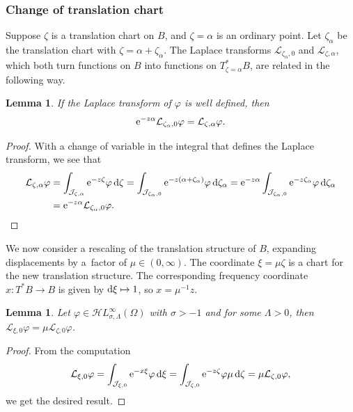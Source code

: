 \documentclass[pdftex]{sigma}
\newcommand{\singexp}[2]{\mathcal{H}L^\infty_{#1, #2}}
\newcommand{\maps}{\colon}
\newcommand{\laplace}{\mathcal{L}}
\numberwithin{equation}{section}
\newtheorem{Lemma}[Theorem]{Lemma}
\begin{document}
\subsubsection{Change of translation chart}\label{sec:change-translation}
Suppose $\zeta$ is a translation chart on $B$, and $\zeta = \alpha$ is an ordinary point. Let $\zeta_\alpha$ be the translation chart with $\zeta = \alpha + \zeta_\alpha$. The Laplace transforms $\laplace_{\zeta_\alpha, 0}$ and $\laplace_{\zeta, \alpha}$, which both turn functions on $B$ into functions on $T^*_{\zeta = \alpha}B$, are related in the following way.
\begin{Lemma}\label{translation}
If the Laplace transform of $\varphi$ is well defined, then
 \begin{equation}
 \label{change-chart}
 {\rm e}^{-z\alpha} \laplace_{\zeta_\alpha, 0} \varphi = \laplace_{\zeta, \alpha} \varphi.
\end{equation}
\end{Lemma}
\begin{proof}
With a change of variable in the integral that defines the Laplace transform, we see that
\begin{align*}
\laplace_{\zeta, \alpha} \varphi & = \int_{\mathcal{J}_{\zeta,\alpha}} {\rm e}^{-z \zeta} \varphi \,{\rm d}\zeta = \int_{\mathcal{J}_{\zeta_\alpha,0}} {\rm e}^{-z(\alpha + \zeta_\alpha)} \varphi \,{\rm d}\zeta_\alpha = {\rm e}^{-z\alpha } \int_{\mathcal{J}_{\zeta_\alpha,0}} {\rm e}^{-z\zeta_\alpha} \varphi\, {\rm d}\zeta_\alpha \\
& = {\rm e}^{-z\alpha } \laplace_{\zeta_\alpha, 0} \varphi.\tag*{\qed}
\end{align*} \renewcommand{\qed}{}
\end{proof}

We now consider a rescaling of the translation structure of $B$, expanding displacements by a~factor of $\mu \in (0, \infty)$. The coordinate $\xi = \mu\zeta$ is a chart for the new translation structure. The corresponding frequency coordinate $x \maps T^*B \to B$ is given by ${\rm d}\xi \mapsto 1$, so $x = \mu^{-1} z$.
\begin{Lemma}
Let $\varphi\in\singexp{\sigma}{\Lambda}(\Omega)$ with $\sigma>-1$ and for some $\Lambda>0$, then
$\laplace_{\xi, 0} \varphi = \mu \laplace_{\zeta, 0} \varphi$.
\end{Lemma}
\begin{proof}
 From the computation
 \begin{equation*}
\laplace_{\xi, 0} \varphi = \int_{\mathcal{J}_{\xi, 0}} {\rm e}^{-x\xi} \varphi \,{\rm d}\xi = \int_{\mathcal{J}_{\zeta, 0}} {\rm e}^{-z \zeta} \varphi \mu \,{\rm d}\zeta = \mu \laplace_{\zeta, 0} \varphi,
\end{equation*}
we get the desired result.
\end{proof}
\end{document}
